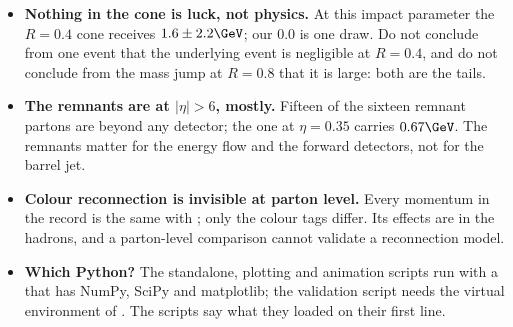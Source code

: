 \begin{pitfalls}
\begin{itemize}[nosep]
    Say which rule you use before comparing with a \CMSSW figure.
  \item \textbf{Nothing in the cone is luck, not physics.} At this impact
    parameter the $R=0.4$ cone receives $1.6\pm2.2\GeV$; our $0.0$ is one
    draw. Do not conclude from one event that the underlying event is
    negligible at $R=0.4$, and do not conclude from the mass jump at
    $R=0.8$ that it is large: both are the tails.
  \item \textbf{The remnants are at $|\eta|>6$, mostly.} Fifteen of the
    sixteen remnant partons are beyond any detector; the one at
    $\eta=0.35$ carries $0.67\GeV$. The remnants matter for the energy flow
    and the forward detectors, not for the barrel jet.
  \item \textbf{Colour reconnection is invisible at parton level.} Every
    momentum in the record is the same with ; only the colour
    tags differ. Its effects are in the hadrons, and a parton-level
    comparison cannot validate a reconnection model.
  \item \textbf{Which Python?} The standalone, plotting and animation
    scripts run with a  that has NumPy, SciPy and matplotlib;
    the validation script needs the virtual environment of
    . The scripts say what they loaded on their
    first line.
\end{itemize}
\end{pitfalls}

